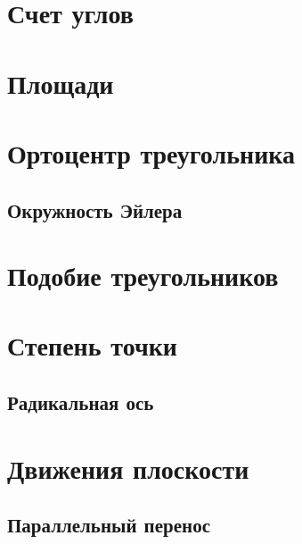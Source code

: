 \documentclass[twoside]{article}
\begin{document}
\pagestyle{empty}

\newpage

\tableofcontents
\newpage

\setcounter{page}{1}
\pagestyle{fancy}

\section{Счет углов}

% 

\section{Площади}

\section{Ортоцентр треугольника}



\subsection{Окружность Эйлера}


\section{Подобие треугольников}

\section{Степень точки}


\subsection{Радикальная ось}


\section{Движения плоскости}
\subsection{Параллельный перенос}
\end{document}
